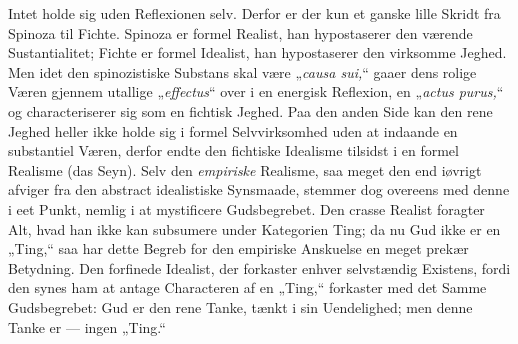 \documentclass[12pt]{book}
\newcommand{\opage}[1]{\marginnote{\footnotesize\textit{[#1]}}}
\begin{document}
Intet holde sig uden Reflexionen selv. Derfor er der kun et ganske lille Skridt fra
Spinoza til Fichte. Spinoza er formel Realist, han hypostaserer den værende
Sustantialitet; Fichte er formel Idealist, han hypostaserer den virksomme Jeghed. Men
idet den spinozistiske Substans skal være „\textit{causa sui,}“ gaaer dens rolige Væren
gjennem utallige „\textit{effectus}“ over i en energisk Reflexion, en
„\textit{actus purus,}“ og characteriserer sig som en fichtisk Jeghed.
\opage{184} %
Paa den anden Side kan den rene Jeghed heller ikke holde sig i formel Selvvirksomhed uden
at indaande en substantiel Væren, derfor endte den fichtiske Idealisme tilsidst i en
formel Realisme (das Seyn). Selv den \emph{empiriske} Realisme, saa meget den end iøvrigt
afviger fra den abstract idealistiske Synsmaade, stemmer dog overeens med denne i eet
Punkt, nemlig i at mystificere Gudsbegrebet. Den crasse Realist foragter Alt, hvad han
ikke kan subsumere under Kategorien Ting; da nu Gud ikke er en „Ting,“ saa har dette
Begreb for den empiriske Anskuelse en meget prekær Betydning. Den forfinede Idealist, der
forkaster enhver selvstændig Existens, fordi den synes ham at antage Characteren af en
„Ting,“ forkaster med det Samme Gudsbegrebet: Gud er den rene Tanke, tænkt i sin
Uendelighed; men denne Tanke er --- ingen „Ting.“
\end{document}
